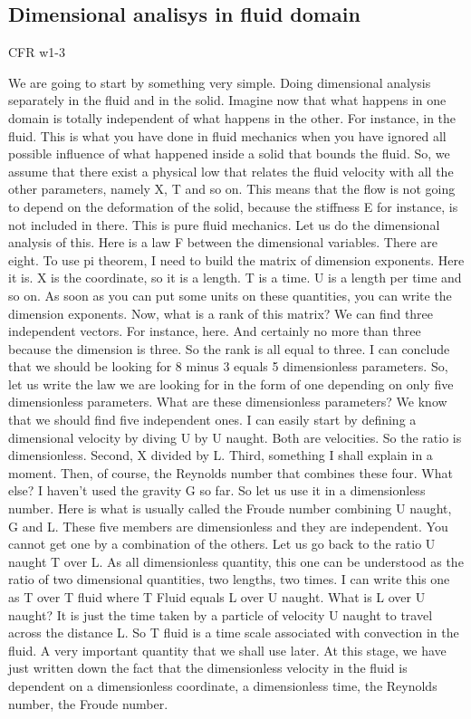 \subsection{Dimensional analisys in fluid domain}

CFR w1-3

We are going to start by
something very simple. Doing dimensional analysis separately
in the fluid and in the solid. Imagine now that what
happens in one domain is totally independent of
what happens in the other. For instance, in the fluid. This is what you have
done in fluid mechanics when you have ignored all possible
influence of what happened inside a solid that bounds the fluid. So, we assume that there exist
a physical low that relates the fluid velocity with all the other
parameters, namely X, T and so on. This means that the flow is not going to
depend on the deformation of the solid, because the stiffness E  for instance,
is not included in there. This is pure fluid mechanics. Let us do the dimensional
analysis of this. Here is a law F between
the dimensional variables. There are eight. To use pi theorem, I need to build
the matrix of dimension exponents. Here it is. X is the coordinate, so it is a length. T is a time. U is a  length per time and so on. As soon as you can put some
units on these quantities, you can write the dimension exponents. Now, what is a rank of this matrix? We can find three independent vectors. For instance, here. And certainly no more than three
because the dimension is three. So the rank is all equal to three. I can conclude that we
should be looking for 8 minus 3 equals 5 dimensionless parameters. So, let us write the law
we are looking for in the form of one depending on
only five dimensionless parameters. What are these dimensionless parameters? We know that we should find
five independent ones. I can easily start by defining a dimensional
velocity by diving U by U naught. Both are velocities. So the ratio is dimensionless. Second, X divided by L. Third, something I shall
explain in a moment. Then, of course, the Reynolds
number that combines these four. What else? I haven't used the gravity G so far. So let us use it in
a dimensionless number. Here is what is usually called the Froude
number combining U naught, G and L. These five members are dimensionless and
they are independent. You cannot get one by
a combination of the others. Let us go back to the ratio
U naught T over L. As all dimensionless quantity,
this one can be understood as the ratio of two dimensional quantities,
two lengths, two times. I can write this one as T over T fluid
where T Fluid equals L over U naught. What is L over U naught? It is just the time taken by
a particle of velocity U naught to travel across the distance L. So T fluid is a time scale associated
with convection in the fluid. A very important quantity
that we shall use later. At this stage, we have just written
down the fact that the dimensionless velocity in  the fluid is dependent
on a dimensionless coordinate, a dimensionless  time,
the Reynolds number, the Froude number.

